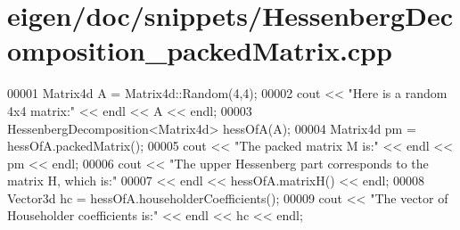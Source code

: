 \hypertarget{eigen_2doc_2snippets_2_hessenberg_decomposition__packed_matrix_8cpp_source}{}\section{eigen/doc/snippets/\+Hessenberg\+Decomposition\+\_\+packed\+Matrix.cpp}
\label{eigen_2doc_2snippets_2_hessenberg_decomposition__packed_matrix_8cpp_source}

\begin{DoxyCode}
00001 Matrix4d A = Matrix4d::Random(4,4);
00002 cout << \textcolor{stringliteral}{"Here is a random 4x4 matrix:"} << endl << A << endl;
00003 HessenbergDecomposition<Matrix4d> hessOfA(A);
00004 Matrix4d pm = hessOfA.packedMatrix();
00005 cout << \textcolor{stringliteral}{"The packed matrix M is:"} << endl << pm << endl;
00006 cout << \textcolor{stringliteral}{"The upper Hessenberg part corresponds to the matrix H, which is:"} 
00007      << endl << hessOfA.matrixH() << endl;
00008 Vector3d hc = hessOfA.householderCoefficients();
00009 cout << \textcolor{stringliteral}{"The vector of Householder coefficients is:"} << endl << hc << endl;
\end{DoxyCode}
